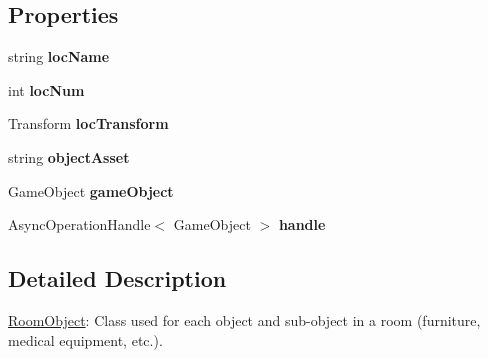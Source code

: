 \subsection*{Properties}
\begin{DoxyCompactItemize}
\item 
string {\bfseries loc\+Name}\hypertarget{class_room_object_a62de13bd465f1c3887fab7bfcba1fa14}{}\label{class_room_object_a62de13bd465f1c3887fab7bfcba1fa14}

\item 
int {\bfseries loc\+Num}\hypertarget{class_room_object_a4f3fc564f819a477f7652297db4270f5}{}\label{class_room_object_a4f3fc564f819a477f7652297db4270f5}

\item 
Transform {\bfseries loc\+Transform}\hypertarget{class_room_object_ab87c47750239563a0f63c1a0586bfb46}{}\label{class_room_object_ab87c47750239563a0f63c1a0586bfb46}

\item 
string {\bfseries object\+Asset}\hypertarget{class_room_object_aac6b31bcce4faf313c8e1123da3cad12}{}\label{class_room_object_aac6b31bcce4faf313c8e1123da3cad12}

\item 
Game\+Object {\bfseries game\+Object}\hypertarget{class_room_object_a57d715cef98078120360f9ce93b30a8f}{}\label{class_room_object_a57d715cef98078120360f9ce93b30a8f}

\item 
Async\+Operation\+Handle$<$ Game\+Object $>$ {\bfseries handle}\hypertarget{class_room_object_a186f3a34e1a575eabefaeaa89676cdca}{}\label{class_room_object_a186f3a34e1a575eabefaeaa89676cdca}

\end{DoxyCompactItemize}


\subsection{Detailed Description}
\hyperlink{class_room_object}{Room\+Object}\+: Class used for each object and sub-\/object in a room (furniture, medical equipment, etc.). 

